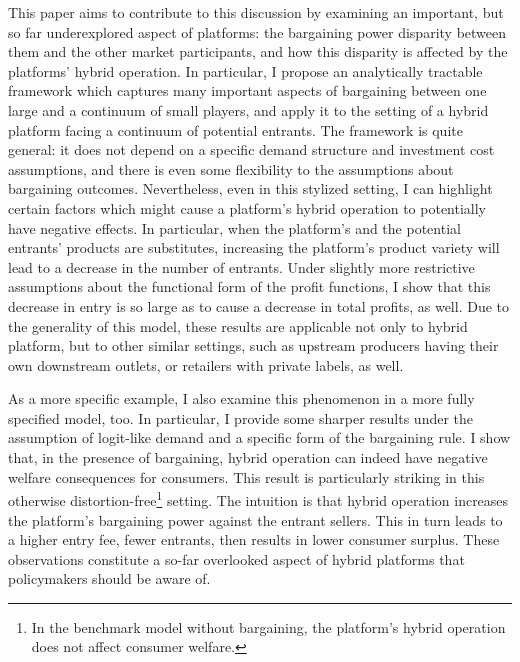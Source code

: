 \documentclass[a4paper]{article}
\begin{document}
This paper aims to contribute to this discussion by examining an important, but so far underexplored aspect of platforms: the bargaining power disparity between them and the other market participants, and how this disparity is affected by the platforms' hybrid operation.
In particular, I propose an analytically tractable framework which captures many important aspects of bargaining between one large and a continuum of small players, and apply it to the setting of a hybrid platform facing a continuum of potential entrants.
The framework is quite general: it does not depend on a specific demand structure and investment cost assumptions, and there is even some flexibility to the assumptions about bargaining outcomes.
Nevertheless, even in this stylized setting, I can highlight certain factors which might cause a platform's hybrid operation to potentially have negative effects. 
In particular, when the platform's and the potential entrants' products are substitutes, increasing the platform's product variety will lead to a decrease in the number of entrants.
Under slightly more restrictive assumptions about the functional form of the profit functions, I show that this decrease in entry is so large as to cause a decrease in total profits, as well.
Due to the generality of this model, these results are applicable not only to hybrid platform, but to other similar settings, such as upstream producers having their own downstream outlets, or retailers with private labels, as well.

As a more specific example, I also examine this phenomenon in a more fully specified model, too.
In particular, I provide some sharper results under the assumption of logit-like demand and a specific form of the bargaining rule.
I show that, in the presence of bargaining, hybrid operation can indeed have negative welfare consequences for consumers.
This result is particularly striking in this otherwise distortion-free\footnote{
    In the benchmark model without bargaining, the platform's hybrid operation does not affect consumer welfare.
} setting. 
The intuition is that hybrid operation increases the platform's bargaining power against the entrant sellers.
This in turn leads to a higher entry fee, fewer entrants, then results in lower consumer surplus.
These observations constitute a so-far overlooked aspect of hybrid platforms that policymakers should be aware of.
\end{document}
